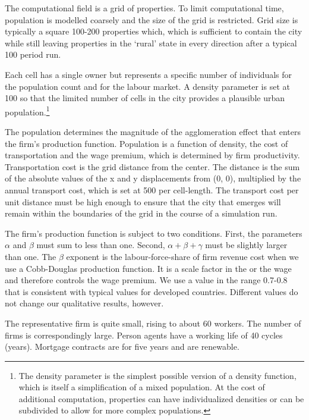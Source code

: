 The computational field is a grid of properties. To limit computational time, population is modelled coarsely and the size of the grid is restricted.  Grid size is typically a square 100-200 properties which, which is sufficient to contain the city while still leaving properties in the `rural' state in every direction after a typical 100 period run. 

Each cell has a single owner but represents a specific number of individuals for the population count and for the labour market. A density parameter is set at 100 so that the limited number of cells in the city provides a plausible urban population.\footnote{The density parameter is the simplest possible version of a density function, which is itself a simplification of a mixed population. At the cost of additional computation, properties can have individualized densities or can be subdivided to allow for more complex populations.}

The population determines the magnitude of the agglomeration effect that enters the firm's production function. Population is a function of density, the cost of transportation and the wage premium, which is determined by firm productivity. Transportation cost is the grid distance from the center. The distance is the sum of the absolute values of the x and y displacements from (0, 0), multiplied by the annual transport cost, which is set at 500 per cell-length. The transport cost per unit distance must be high enough to ensure that the city that emerges will remain within the boundaries of the grid in the course of a simulation run.

The firm's production function is subject to two conditions. First, the parameters $\alpha$  and $\beta$ must sum to less than one. Second, $\alpha +\beta + \gamma$ must be slightly larger than one.  The $\beta$ exponent is the labour-force-share of  firm revenue cost when we use a Cobb-Douglas production function. It is a scale factor in the or the wage and therefore controls the wage premium. We use a value in the range  0.7-0.8 that is consistent with typical values for developed countries. %
Different values do not change  our qualitative results, however.  


The representative firm is quite small, rising to about 60 workers. The number of firms is correspondingly large. 
Person agents have a working life of 40 cycles (years). Mortgage contracts are  for five years and are renewable.

